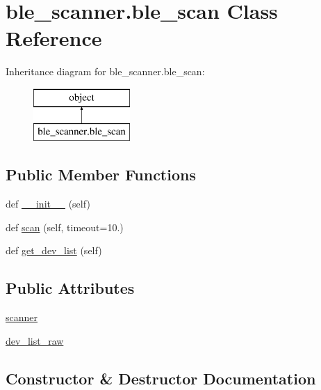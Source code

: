 \hypertarget{classble__scanner_1_1ble__scan}{}\section{ble\+\_\+scanner.\+ble\+\_\+scan Class Reference}
\label{classble__scanner_1_1ble__scan}
Inheritance diagram for ble\+\_\+scanner.\+ble\+\_\+scan\+:\begin{figure}[H]
\begin{center}
\leavevmode
\includegraphics[height=2.000000cm]{classble__scanner_1_1ble__scan}
\end{center}
\end{figure}
\subsection*{Public Member Functions}
\begin{DoxyCompactItemize}
\item 
def \hyperlink{classble__scanner_1_1ble__scan_a4dd1c46e89c06d39bca330a729ac85e2}{\+\_\+\+\_\+init\+\_\+\+\_\+} (self)
\item 
def \hyperlink{classble__scanner_1_1ble__scan_a6cc017eda9dee844afa2837924c2751e}{scan} (self, timeout=10.)
\item 
def \hyperlink{classble__scanner_1_1ble__scan_a9dcebab128bff36843ec70f48401db3c}{get\+\_\+dev\+\_\+list} (self)
\end{DoxyCompactItemize}
\subsection*{Public Attributes}
\begin{DoxyCompactItemize}
\item 
\hyperlink{classble__scanner_1_1ble__scan_a65324c2e86baf31f888af67adff2fa2d}{scanner}
\item 
\hyperlink{classble__scanner_1_1ble__scan_ad0afbee6b99ed29929fcd907117a44b8}{dev\+\_\+list\+\_\+raw}
\end{DoxyCompactItemize}


\subsection{Constructor \& Destructor Documentation}
\mbox{\label{classble__scanner_1_1ble__scan_a4dd1c46e89c06d39bca330a729ac85e2}} 

